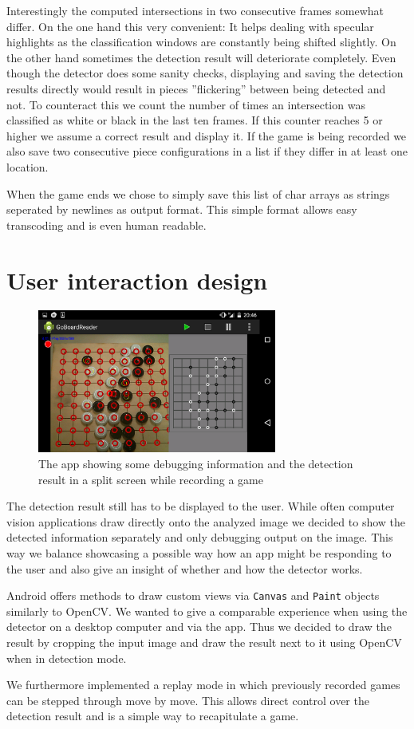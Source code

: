 	Interestingly the computed intersections in two consecutive frames somewhat differ. On the one hand this very convenient: It helps dealing with specular highlights as the classification windows are constantly being shifted slightly. On the other hand sometimes the detection result will deteriorate completely. Even though the detector does some sanity checks, displaying and saving the detection results directly would result in pieces ''flickering'' between being detected and not. To counteract this we count the number of times an intersection was classified as white or black in the last ten frames. If this counter reaches 5 or higher we assume a correct result and display it. If the game is being recorded we also save two consecutive piece configurations in a list if they differ in at least one location.

	When the game ends we chose to simply save this list of char arrays as strings seperated by newlines as output format. This simple format allows easy transcoding and is even human readable.

	\section{User interaction design}
	\label{android-ui}
	\begin{figure}[h]
		\center
		\includegraphics[width=0.7\textwidth]{images/android_ui.png}
		\caption{The app showing some debugging information and the detection result in a split screen while recording a game}
		\label{fig:android_ui}
	\end{figure}
	The detection result still has to be displayed to the user. While often computer vision applications draw directly onto the analyzed image we decided to show the detected information separately and only debugging output on the image. This way we balance showcasing a possible way how an app might be responding to the user and also give an insight of whether and how the detector works.

	Android offers methods to draw custom views via \texttt{Canvas} and \texttt{Paint} objects similarly to OpenCV. We wanted to give a comparable experience when using the detector on a desktop computer and via the app. Thus we decided to draw the result by cropping the input image and draw the result next to it using OpenCV when in detection mode.

	We furthermore implemented a replay mode in which previously recorded games can be stepped through move by move. This allows direct control over the detection result and is a simple way to recapitulate a game.
